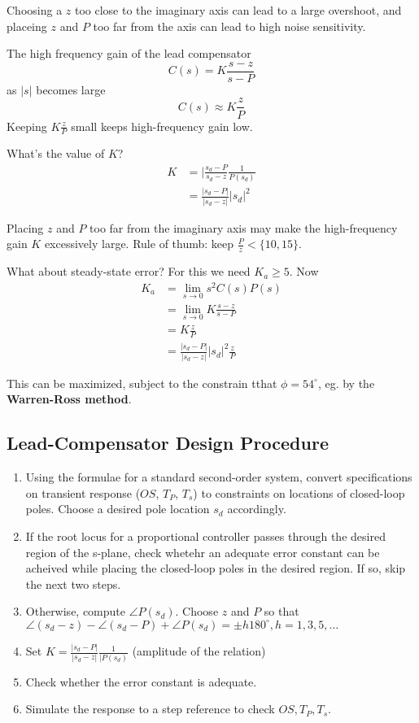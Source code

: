 \documentclass[12pt]{article}
\begin{document}
\begin{example}
Choosing a $z$ too close to the imaginary axis can lead to a large overshoot, and placeing $z$ and $P$ too far from the axis can lead to high noise sensitivity.

The high frequency gain of the lead compensator \[ C(s) = K\frac{s-z}{s-P} \] as $|s|$ becomes large \[ C(s) \approx K\frac{z}{P} \] Keeping $K\frac{z}{P}$ small keeps high-frequency gain low.

What's the value of $K$?
\begin{align*}
K &= \Bigg| \frac{s_d - P}{s_d - z} \frac{1}{P(s_d)} \\
&= \frac{|s_d - P|}{|s_d - z|} |s_d|^2
\end{align*}

Placing $z$ and $P$ too far from the imaginary axis may make the high-frequency gain $K$ excessively large. Rule of thumb: keep $\frac{P}{z} < \{10, 15\}$.

What about steady-state error? For this we need $K_a \geq 5$. Now
\begin{align*}
K_a &= \lim_{s\to 0} s^2 C(s)P(s) \\
&= \lim_{s\to 0} K\frac{s-z}{s-P} \\
&= K\frac{z}{P} \\
&= \frac{|s_d - P|}{|s_d - z|} |s_d|^2 \frac{z}{P}
\end{align*}

This can be maximized, subject to the constrain tthat $\phi = 54^\circ$, eg. by the {\bf Warren-Ross method}.
\end{example}

\subsection{Lead-Compensator Design Procedure}
\begin{enumerate}
\item Using the formulae for a standard second-order system, convert specifications on transient response ($OS$, $T_P$, $T_s$) to constraints on locations of closed-loop poles. Choose a desired pole location $s_d$ accordingly.
\item If the root locus for a proportional controller passes through the desired region of the s-plane, check whetehr an adequate error constant can be acheived while placing the closed-loop poles in the desired region. If so, skip the next two steps.
\item Otherwise, compute $\angle P(s_d)$. Choose $z$ and $P$ so that $\angle(s_d - z) - \angle(s_d - P) + \angle P(s_d) = \pm h180^\circ, h=1,3,5,\dots$
\item Set $K = \frac{|s_d - P|}{|s_d - z|} \frac{1}{|P(s_d)}$ (amplitude of the relation)
\item Check whether the error constant is adequate.
\item Simulate the response to a step reference to check $OS, T_P, T_s$.
\end{enumerate}
\end{document}
